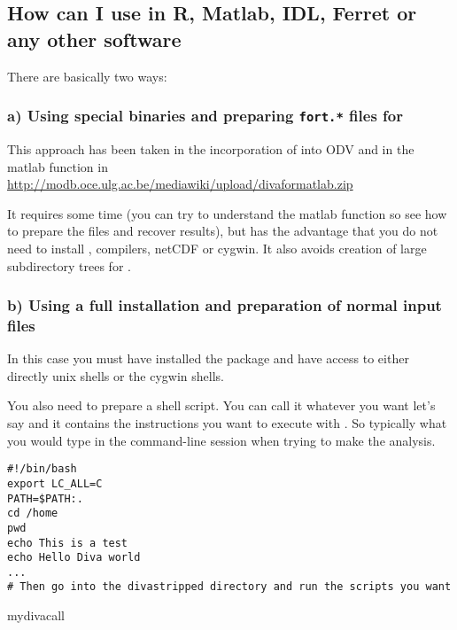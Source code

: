 \subsection{How can I use \diva in R, Matlab, IDL, Ferret or any other software}

There are basically two ways:

\subsubsection{a) Using special binaries and preparing {\tt fort.*} files for \diva}

This approach has been taken in the incorporation of \diva into ODV and in the matlab function in \url{http://modb.oce.ulg.ac.be/mediawiki/upload/divaformatlab.zip}

It requires some time (you can try to understand the matlab function so see how to prepare the files and recover results), but has the advantage that you do not need to install \diva, compilers, netCDF or cygwin. It also avoids creation of large subdirectory trees for \diva. 



\subsubsection{b) Using a full \diva installation and preparation of normal \diva input files}

In this case you must have installed the \diva package and have access to either directly unix shells or the cygwin shells. 

You also need to prepare a shell script. You can call it whatever you want let's say  and it contains the instructions you want to execute with \diva. So typically what you would type in the command-line session when trying to make the analysis.

\begin{exfile}[htpb]
\begin{footnotesize}
\begin{verbatim}
#!/bin/bash
export LC_ALL=C
PATH=$PATH:.
cd /home
pwd
echo This is a test
echo Hello Diva world
...
# Then go into the divastripped directory and run the scripts you want
\end{verbatim}
\end{footnotesize}
\caption{mydivacall\label{ex:mydivacall}}
\end{exfile}



